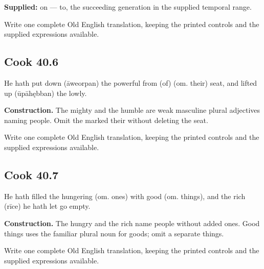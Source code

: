 \textbf{Supplied:} on — to, the succeeding generation in the supplied temporal range.

Write one complete Old English translation, keeping the printed controls and the supplied expressions available.

\par\begin{minipage}{\linewidth}\raggedright
\subsection*{Cook 40.6}

He hath put down (āweorpan) the powerful from (of) (om. their) seat, and lifted up (ūpāhębban) the lowly.

\textbf{Construction.} The mighty and the humble are weak masculine plural adjectives naming people. Omit the marked their without deleting the seat.

Write one complete Old English translation, keeping the printed controls and the supplied expressions available.

\end{minipage}\par\addvspace{4pt}

\par\begin{minipage}{\linewidth}\raggedright
\subsection*{Cook 40.7}

He hath filled the hungering (om. ones) with good (om. things), and the rich (rīce) he hath let go empty.

\textbf{Construction.} The hungry and the rich name people without added ones. Good things uses the familiar plural noun for goods; omit a separate things.

Write one complete Old English translation, keeping the printed controls and the supplied expressions available.

\end{minipage}\par\addvspace{4pt}

